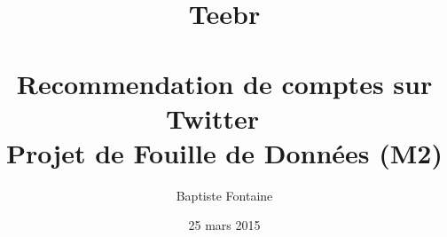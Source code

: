
\title{Teebr\\
    ~\\
  \large Recommendation de comptes sur Twitter
    ~\\
  \large Projet de Fouille de Données (M2)}

\author{Baptiste Fontaine}
\date{25 mars 2015}
